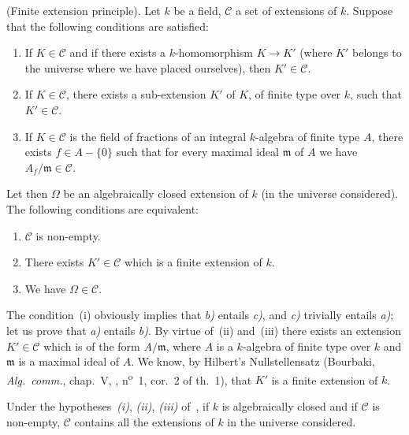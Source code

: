 \begin{proposition}[9.1.1]
\label{IV.9.1.1}
\textnormal{(Finite extension principle).}
Let $k$ be a field, $\mathcal{C}$ a set of extensions of $k$.
Suppose that the following conditions are satisfied:
\begin{enumerate}[label=(\roman*)]
  \item If $K\in\mathcal{C}$ and if there exists a $k$-homomorphism $K\to K'$ (where $K'$ belongs to the universe where we have placed ourselves), then $K'\in\mathcal{C}$.
  \item If $K\in\mathcal{C}$, there exists a sub-extension $K'$ of $K$, of finite type over $k$, such that $K'\in\mathcal{C}$.
  \item If $K\in\mathcal{C}$ is the field of fractions of an integral $k$-algebra of finite type $A$, there exists $f\in A-\{0\}$ such that for every maximal ideal $\mathfrak{m}$ of $A$ we have $A_f/\mathfrak{m}\in\mathcal{C}$.
\end{enumerate}


Let then $\Omega$ be an algebraically closed extension of $k$ (in the universe considered).
The following conditions are equivalent:
\begin{enumerate}[label=\emph{\alph*)}]
  \item $\mathcal{C}$ is non-empty.
  \item There exists $K'\in\mathcal{C}$ which is a finite extension of $k$.
  \item We have $\Omega\in\mathcal{C}$.
\end{enumerate}
\end{proposition}

The condition~(i) obviously implies that \emph{b)} entails \emph{c)}, and \emph{c)} trivially entails \emph{a)};
let us prove that \emph{a)} entails \emph{b)}.
By virtue of~(ii) and~(iii) there exists an extension $K'\in\mathcal{C}$ which is of the form $A/\mathfrak{m}$, where $A$ is a $k$-algebra of finite type over $k$ and $\mathfrak{m}$ is a maximal ideal of $A$.
We know, by Hilbert's Nullstellensatz (Bourbaki, \emph{Alg.\ comm.}, chap.~V, , n\textsuperscript{o}~1, cor.~2 of th.~1), that $K'$ is a finite extension of $k$.

\begin{corollary}[9.1.2]
\label{IV.9.1.2}
Under the hypotheses~\emph{(i)}, \emph{(ii)}, \emph{(iii)} of~, if $k$ is algebraically closed and if $\mathcal{C}$ is non-empty, $\mathcal{C}$ contains all the extensions of $k$ in the universe considered.
\end{corollary}

